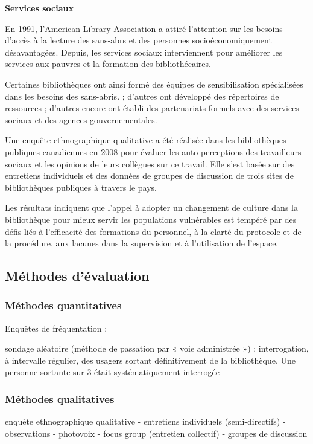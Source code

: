 \documentclass[french,a4paper,12pt]{article}
\begin{document}
\textbf{Services sociaux}

\quad En 1991, l’American Library Association a attiré l’attention sur les besoins d’accès à la lecture des sans-abrs et des personnes socioéconomiquement désavantagées\citep{servicessociaux2008}. Depuis, les services sociaux interviennent pour améliorer les services aux pauvres et la formation des bibliothécaires.  

Certaines bibliothèques ont ainsi formé des équipes de sensibilisation spécialisées dans les besoins des sans-abris. ; d'autres ont développé des répertoires de ressources ; d'autres encore ont établi des partenariats formels avec des services sociaux et des agences gouvernementales. 
 
Une enquête ethnographique qualitative a été réalisée dans les bibliothèques publiques canadiennes en 2008 pour évaluer les auto-perceptions des travailleurs sociaux et les opinions de leurs collègues sur ce travail. Elle s’est basée sur des entretiens individuels et des données de groupes de discussion de trois sites de bibliothèques publiques à travers le pays. 

Les résultats indiquent que l'appel à adopter un changement de culture dans la bibliothèque pour mieux servir les populations vulnérables est tempéré par des défis liés à l'efficacité des formations du personnel, à la clarté du protocole et de la procédure, aux lacunes dans la supervision et à l'utilisation de l'espace. 

\subsection{Méthodes d'évaluation}

\subsubsection{Méthodes quantitatives}

Enquêtes de fréquentation :  

sondage aléatoire (méthode de passation par « voie administrée ») : interrogation, à intervalle régulier, des usagers sortant définitivement de la bibliothèque. Une personne sortante sur 3 était systématiquement interrogée  

\subsubsection{Méthodes qualitatives}

\quad enquête ethnographique qualitative 
- entretiens individuels (semi-directifs)
- observations 
- photovoix 
- focus group (entretien collectif) 
- groupes de discussion 
\end{document}
